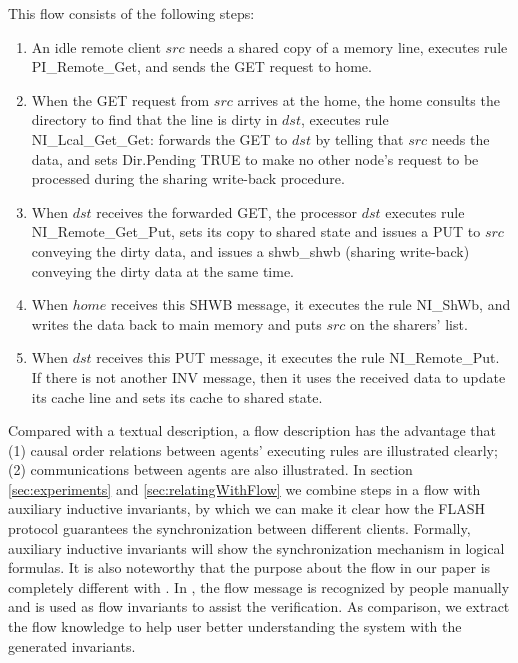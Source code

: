 \documentclass{llncs}
\begin{document}
This flow consists of the following steps:
\begin{enumerate}
\item An idle remote  client $src$ needs a shared copy of a memory line, executes   rule PI\_Remote\_Get, and  sends the GET request to home.

\item  When the GET request from $src$ arrives at the
home, the home consults the directory to find that the line is dirty in $dst$,  executes rule NI\_Lcal\_Get\_Get: forwards the GET to $dst$ by telling that $src$ needs the data, and sets Dir.Pending TRUE to make no  other node's request to be processed during the sharing write-back procedure.

\item  When $dst$ receives the forwarded GET, the
processor $dst$ executes rule \\
NI\_Remote\_Get\_Put, sets its copy to shared state and issues a PUT to $src$ conveying the dirty data,  and  issues a   shwb\_shwb
 (sharing write-back) conveying the dirty data at the same time.

\item   When $home$ receives this SHWB message, it executes the rule NI\_ShWb, and
 writes the
data back  to main memory and puts $src$ on the sharers' list.

\item When $dst$ receives this PUT message, it executes the rule NI\_Remote\_Put. If there is not another INV message, then it   uses the received data to update its cache line and sets its cache to shared state.


\end{enumerate}

Compared with a textual description, a flow description has the advantage that (1) causal order relations between agents' executing rules are illustrated clearly; (2) communications between agents are also illustrated. In section \ref{sec:experiments} and \ref{sec:relatingWithFlow} we combine steps in a flow with auxiliary inductive invariants, by which we can make it clear  how the FLASH protocol guarantees the synchronization between different clients. Formally, auxiliary inductive invariants will show    the synchronization mechanism in logical formulas. It is also noteworthy that the purpose about the flow in our paper is completely different with \cite{Talupur2008a}. In \cite{Talupur2008a}, the flow message is recognized by people manually and is used as flow invariants to assist the verification. As comparison, we extract the flow knowledge  to help user better understanding the system with the generated invariants.
\end{document}
